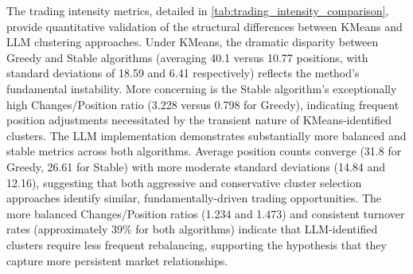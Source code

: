 

The trading intensity metrics, detailed in \cref{tab:trading_intensity_comparison}, provide quantitative validation of the structural differences between KMeans and LLM clustering approaches. Under KMeans, the dramatic disparity between Greedy and Stable algorithms (averaging 40.1 versus 10.77 positions, with standard deviations of 18.59 and 6.41 respectively) reflects the method's fundamental instability. More concerning is the Stable algorithm's exceptionally high Changes/Position ratio (3.228 versus 0.798 for Greedy), indicating frequent position adjustments necessitated by the transient nature of KMeans-identified clusters.
The LLM implementation demonstrates substantially more balanced and stable metrics across both algorithms. Average position counts converge (31.8 for Greedy, 26.61 for Stable) with more moderate standard deviations (14.84 and 12.16), suggesting that both aggressive and conservative cluster selection approaches identify similar, fundamentally-driven trading opportunities. The more balanced Changes/Position ratios (1.234 and 1.473) and consistent turnover rates (approximately 39\% for both algorithms) indicate that LLM-identified clusters require less frequent rebalancing, supporting the hypothesis that they capture more persistent market relationships.

